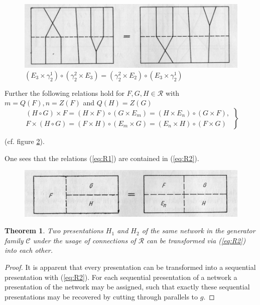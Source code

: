 \documentclass{article}
\newtheorem{theorem}{Theorem}
\begin{document}
\begin{figure}
\includegraphics[]{figure10.png}
\caption{
  $(E_{3} \times \gamma_2^1) \circ (\gamma_2^2 \times E_{3}) = (\gamma_2^2 \times E_{2}) \circ (E_{3} \times \gamma_2^1)$ 
}
\label{fig:figure10}
\end{figure}

Further the following relations hold for $F, G, H \in \mathcal{R}$ with $m = Q(F), n = Z(F)$ and $Q(H)=Z(G)$
\begin{equation}
\label{eq:R2}
\tag{R2}
\left.
\begin{array}{c}
(H \circ G) \times F = (H \times F) \circ (G \times E_m) = (H \times E_n) \circ (G \times F), \\
F \times (H \circ G) = (F \times H) \circ (E_m \times G) = (E_n \times H) \circ (F \times G)
\end{array} 
\right\}
\end{equation}

(cf. figure \ref{fig:figure11}).

One sees that the relations (\ref{eq:R1}) are contained in (\ref{eq:R2}).


\begin{figure}
\includegraphics[]{figure11.png}
\caption{}
\label{fig:figure11}
\end{figure}

\begin{theorem}
Two presentations $H_1$ and $H_2$ of the same network in the generator family $\mathcal{C}$ under the usage of connections of $\mathcal{R}$ can be transformed via (\ref{eq:R2}) into each other.
\end{theorem}
\begin{proof}
It is apparent that every presentation can be transformed into a sequential presentation with (\ref{eq:R2}). For each sequential presentation of a network a presentation of the network may be assigned, such that exactly these sequential presentations may be recovered by cutting through parallels to $g$.
\end{proof}
\end{document}
